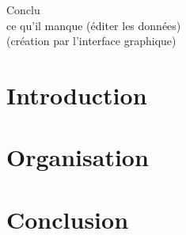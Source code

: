 \documentclass[a4paper]{report}
\begin{document}



\tableofcontents

	Conclu\\
		ce qu'il manque (éditer les données)\\
		(création par l'interface graphique)

	
\chapter*{Introduction}



\chapter{Organisation}
%
	
\chapter*{Conclusion}
%
\end{document}
